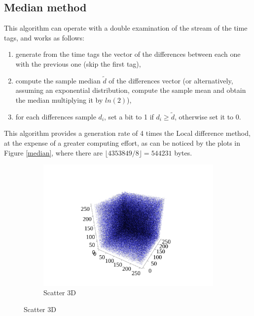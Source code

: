 \documentclass[10pt, final]{article}
\begin{document}
\begin{multicols}{2}
\subsection*{Median method}
This algorithm can operate with a double examination of the stream of the time tags, and works as follows:
\begin{enumerate}
    \item generate from the time tags the vector of the differences between each one with the previous one (skip the first tag),
    \item compute the sample median $\widetilde{d}$ of the differences vector (or alternatively, assuming an exponential distribution, compute the sample mean and obtain the median multiplying it by $ln(2)$),
    \item for each differences sample $d_i$, set a bit to 1 if $d_i \geq \widetilde{d}$, otherwise set it to 0.
\end{enumerate}
This algorithm provides a generation rate of 4 times the Local difference method, at the expense of a greater computing effort, as can be noticed by the plots in Figure \ref{median}, where there are $\lfloor 4353849/8\rfloor = 544231$ bytes.
\begin{mdframed}
    \begin{figure}[H]
        \begin{subfigure}{\textwidth}
            \centering
            \includegraphics[width = \textwidth]{../random_img/naif-scatter3d.pdf}
            \caption{Scatter 3D}
        \end{subfigure}


\end{figure}
\end{mdframed}
\end{multicols}
\end{document}
